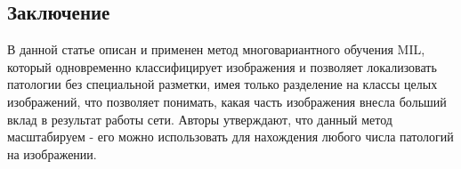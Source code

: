 \subsection*{Заключение}
В данной статье описан и применен метод многовариантного обучения MIL, который одновременно 
классифицирует изображения и позволяет локализовать патологии без специальной разметки, 
имея только разделение на классы целых изображений, что позволяет понимать, какая 
часть изображения внесла больший вклад в результат работы сети.  Авторы утверждают, что данный метод масштабируем - 
его можно использовать для нахождения любого числа патологий на изображении.